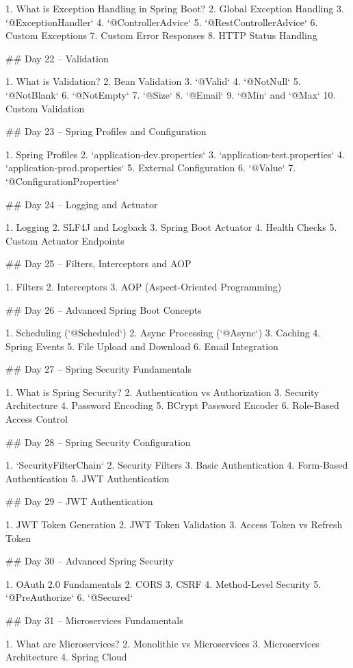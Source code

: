 1. What is Exception Handling in Spring Boot?
2. Global Exception Handling
3. `@ExceptionHandler`
4. `@ControllerAdvice`
5. `@RestControllerAdvice`
6. Custom Exceptions
7. Custom Error Responses
8. HTTP Status Handling

## Day 22 – Validation

1. What is Validation?
2. Bean Validation
3. `@Valid`
4. `@NotNull`
5. `@NotBlank`
6. `@NotEmpty`
7. `@Size`
8. `@Email`
9. `@Min` and `@Max`
10. Custom Validation

## Day 23 – Spring Profiles and Configuration

1. Spring Profiles
2. `application-dev.properties`
3. `application-test.properties`
4. `application-prod.properties`
5. External Configuration
6. `@Value`
7. `@ConfigurationProperties`

## Day 24 – Logging and Actuator

1. Logging
2. SLF4J and Logback
3. Spring Boot Actuator
4. Health Checks
5. Custom Actuator Endpoints

## Day 25 – Filters, Interceptors and AOP

1. Filters
2. Interceptors
3. AOP (Aspect-Oriented Programming)

## Day 26 – Advanced Spring Boot Concepts

1. Scheduling (`@Scheduled`)
2. Async Processing (`@Async`)
3. Caching
4. Spring Events
5. File Upload and Download
6. Email Integration

## Day 27 – Spring Security Fundamentals

1. What is Spring Security?
2. Authentication vs Authorization
3. Security Architecture
4. Password Encoding
5. BCrypt Password Encoder
6. Role-Based Access Control

## Day 28 – Spring Security Configuration

1. `SecurityFilterChain`
2. Security Filters
3. Basic Authentication
4. Form-Based Authentication
5. JWT Authentication

## Day 29 – JWT Authentication

1. JWT Token Generation
2. JWT Token Validation
3. Access Token vs Refresh Token

## Day 30 – Advanced Spring Security

1. OAuth 2.0 Fundamentals
2. CORS
3. CSRF
4. Method-Level Security
5. `@PreAuthorize`
6. `@Secured`

## Day 31 – Microservices Fundamentals

1. What are Microservices?
2. Monolithic vs Microservices
3. Microservices Architecture
4. Spring Cloud

